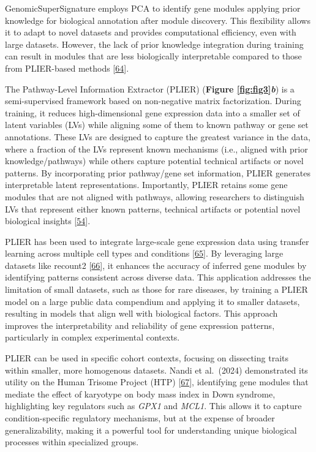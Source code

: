GenomicSuperSignature employs PCA to identify gene modules applying prior knowledge for biological annotation after module discovery.
This flexibility allows it to adapt to novel datasets and provides computational efficiency, even with large datasets.
However, the lack of prior knowledge integration during training can result in modules that are less biologically interpretable compared to those from PLIER-based methods {[}\protect\hyperlink{ref-X4fhSCkz}{64}{]}.

The Pathway-Level Information Extractor (PLIER) (\textbf{Figure \ref{fig:fig3}\emph{b}}) is a semi-supervised framework based on non-negative matrix factorization.
During training, it reduces high-dimensional gene expression data into a smaller set of latent variables (LVs) while aligning some of them to known pathway or gene set annotations.
These LVs are designed to capture the greatest variance in the data, where a fraction of the LVs represent known mechanisms (i.e., aligned with prior knowledge/pathways) while others capture potential technical artifacts or novel patterns.
By incorporating prior pathway/gene set information, PLIER generates interpretable latent representations.
Importantly, PLIER retains some gene modules that are not aligned with pathways, allowing researchers to distinguish LVs that represent either known patterns, technical artifacts or potential novel biological insights {[}\protect\hyperlink{ref-dg9nKuy0}{54}{]}.

PLIER has been used to integrate large-scale gene expression data using transfer learning across multiple cell types and conditions {[}\protect\hyperlink{ref-14rnBunuZ}{65}{]}.
By leveraging large datasets like recount2 {[}\protect\hyperlink{ref-6SPTvFXq}{66}{]}, it enhances the accuracy of inferred gene modules by identifying patterns consistent across diverse data.
This application addresses the limitation of small datasets, such as those for rare diseases, by training a PLIER model on a large public data compendium and applying it to smaller datasets, resulting in models that align well with biological factors.
This approach improves the interpretability and reliability of gene expression patterns, particularly in complex experimental contexts.

PLIER can be used in specific cohort contexts, focusing on dissecting traits within smaller, more homogenous datasets.
Nandi et al.~(2024) demonstrated its utility on the Human Trisome Project (HTP) {[}\protect\hyperlink{ref-v5DtVejF}{67}{]}, identifying gene modules that mediate the effect of karyotype on body mass index in Down syndrome, highlighting key regulators such as \emph{GPX1} and \emph{MCL1}.
This allows it to capture condition-specific regulatory mechanisms, but at the expense of broader generalizability, making it a powerful tool for understanding unique biological processes within specialized groups.

